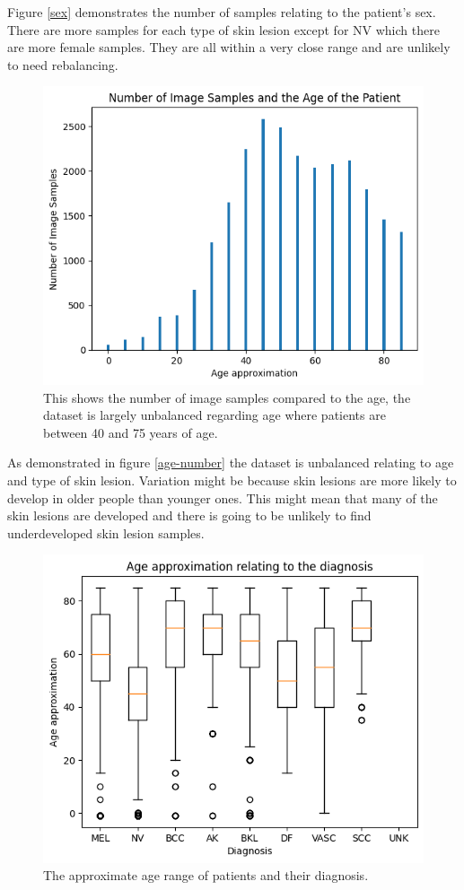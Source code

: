 Figure \ref{sex} demonstrates the number of samples relating to the patient's sex. There are more samples for each type of skin lesion except for NV which there are more female samples. They are all within a very close range and are unlikely to need rebalancing.

\begin{figure}
	\centering
	\includegraphics[scale=0.8]{images/ISIC/age-number.png}
	\caption{This shows the number of image samples compared to the age, the dataset is largely unbalanced regarding age where patients are between 40 and 75 years of age.}
\end{figure} \label{age-number}

As demonstrated in figure \ref{age-number} the dataset is unbalanced relating to age and type of skin lesion. Variation might be because skin lesions are more likely to develop in older people than younger ones. This might mean that many of the skin lesions are developed and there is going to be unlikely to find underdeveloped skin lesion samples.

\begin{figure}
	\centering
	\includegraphics[scale=0.8]{images/ISIC/diagnosis-age.png}
	\caption{The approximate age range of patients and their diagnosis.} 
\end{figure} \label{diagnosis-age}

